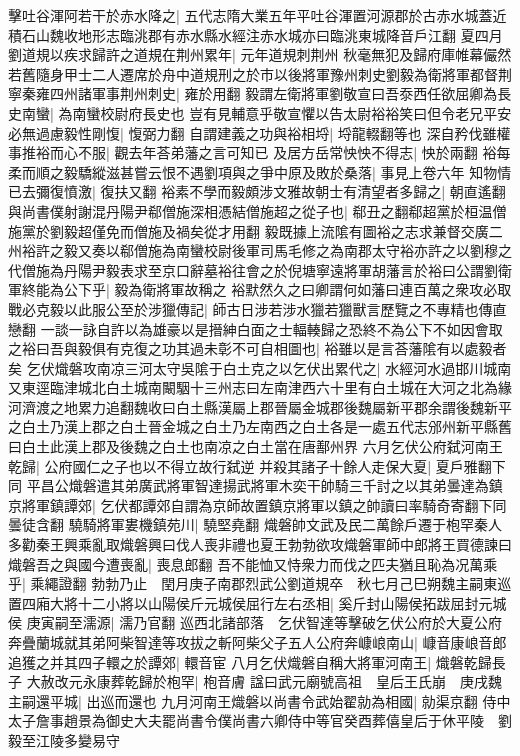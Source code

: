 擊吐谷渾阿若干於赤水降之|{
	五代志隋大業五年平吐谷渾置河源郡於古赤水城蓋近積石山魏收地形志臨洮郡有赤水縣水經注赤水城亦曰臨洮東城降音戶江翻}
夏四月劉道規以疾求歸許之道規在荆州累年|{
	元年道規刺荆州}
秋毫無犯及歸府庫帷幕儼然若舊隨身甲士二人遷席於舟中道規刑之於市以後將軍豫州刺史劉毅為衛將軍都督荆寧秦雍四州諸軍事荆州刺史|{
	雍於用翻}
毅謂左衛將軍劉敬宣曰吾沗西任欲屈卿為長史南蠻|{
	為南蠻校尉府長史也}
豈有見輔意乎敬宣懼以告太尉裕裕笑曰但令老兄平安必無過慮毅性剛愎|{
	愎弼力翻}
自謂建義之功與裕相埒|{
	埒龍輟翻等也}
深自矜伐雖權事推裕而心不服|{
	觀去年荅弟藩之言可知已}
及居方岳常怏怏不得志|{
	怏於兩翻}
裕每柔而順之毅驕縱滋甚嘗云恨不遇劉項與之爭中原及敗於桑落|{
	事見上卷六年}
知物情已去彌復憤激|{
	復扶又翻}
裕素不學而毅頗涉文雅故朝士有清望者多歸之|{
	朝直遙翻}
與尚書僕射謝混丹陽尹郗僧施深相憑結僧施超之從子也|{
	郗丑之翻郗超黨於桓温僧施黨於劉毅超僅免而僧施及禍矣從才用翻}
毅既據上流隂有圖裕之志求兼督交廣二州裕許之毅又奏以郗僧施為南蠻校尉後軍司馬毛修之為南郡太守裕亦許之以劉穆之代僧施為丹陽尹毅表求至京口辭墓裕往會之於倪塘寧遠將軍胡藩言於裕曰公謂劉衛軍終能為公下乎|{
	毅為衛將軍故稱之}
裕默然久之曰卿謂何如藩曰連百萬之衆攻必取戰必克毅以此服公至於涉獵傳記|{
	師古日涉若涉水獵若獵獸言歷覽之不專精也傳直戀翻}
一談一詠自許以為雄豪以是搢紳白面之士輻輳歸之恐終不為公下不如因會取之裕曰吾與毅俱有克復之功其過未彰不可自相圖也|{
	裕雖以是言荅藩隂有以處毅者矣}
乞伏熾磐攻南凉三河太守吳隂于白土克之以乞伏出累代之|{
	水經河水過邯川城南又東逕臨津城北白土城南闞駰十三州志曰左南津西六十里有白土城在大河之北為緣河濟渡之地累力追翻魏收曰白土縣漢屬上郡晉屬金城郡後魏屬新平郡余謂後魏新平之白土乃漢上郡之白土晉金城之白土乃左南西之白土各是一處五代志邠州新平縣舊曰白土此漢上郡及後魏之白土也南凉之白土當在唐鄯州界}
六月乞伏公府弑河南王乾歸|{
	公府國仁之子也以不得立故行弑逆}
并殺其諸子十餘人走保大夏|{
	夏戶雅翻下同}
平昌公熾磐遣其弟廣武將軍智達揚武將軍木奕干帥騎三千討之以其弟曇達為鎮京將軍鎮譚郊|{
	乞伏都譚郊自謂為京師故置鎮京將軍以鎮之帥讀曰率騎奇寄翻下同曇徒含翻}
驍騎將軍婁機鎮苑川|{
	驍堅堯翻}
熾磐帥文武及民二萬餘戶遷于枹罕秦人多勸秦王興乘亂取熾磐興曰伐人喪非禮也夏王勃勃欲攻熾磐軍師中郎將王買德諫曰熾磐吾之與國今遭喪亂|{
	喪息郎翻}
吾不能恤又恃衆力而伐之匹夫猶且恥為况萬乘乎|{
	乘繩證翻}
勃勃乃止　閏月庚子南郡烈武公劉道規卒　秋七月己巳朔魏主嗣東巡置四廂大將十二小將以山陽侯斤元城侯屈行左右丞相|{
	奚斤封山陽侯拓跋屈封元城侯}
庚寅嗣至濡源|{
	濡乃官翻}
巡西北諸部落　乞伏智達等擊破乞伏公府於大夏公府奔疊蘭城就其弟阿柴智達等攻拔之斬阿柴父子五人公府奔嵻㟍南山|{
	嵻音康㟍音郎}
追獲之并其四子轘之於譚郊|{
	轘音宦}
八月乞伏熾磐自稱大將軍河南王|{
	熾磐乾歸長子}
大赦改元永康葬乾歸於枹罕|{
	枹音膚}
諡曰武元廟號高祖　皇后王氏崩　庚戌魏主嗣還平城|{
	出巡而還也}
九月河南王熾磐以尚書令武始翟勍為相國|{
	勍渠京翻}
侍中太子詹事趙景為御史大夫罷尚書令僕尚書六卿侍中等官癸酉葬僖皇后于休平陵　劉毅至江陵多變易守

